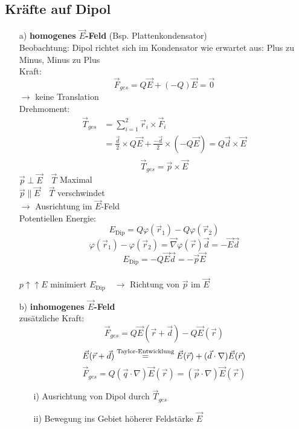 \documentclass[titlepage,12pt,a4paper,ngerman]{report}
\newcommand{\tx}[1]{\textrm{#1}}
\begin{document}

\subsection{Kräfte auf Dipol}
\begin{itemize}
\item[a)] \textbf{homogenes $\vec{E}$-Feld} (Bsp. Plattenkondensator)\\
Beobachtung: Dipol richtet sich im Kondensator wie erwartet aus: Plus zu Minus, Minus zu Plus\\
Kraft: $$\vec{F}_{ges} = Q \vec{E} + (-Q) \vec{E} = \vec{0}$$ $\rightarrow$ keine Translation\\
Drehmoment: \begin{align*}
\vec{T}_{ges} & = \sum^2_{i=1} \vec{r}_i\times \vec{F}_i \\
& = \frac{\vec{d}}{2} \times Q\vec{E} + \frac{-\vec{d}}{2} \times (-Q\vec{E}) = Q \vec{d} \times \vec{E}\\
\end{align*}
$$\boxed{\vec{T}_{ges} = \vec{p} \times \vec{E}}$$
$\vec{p} \perp \vec{E} \quad \vec{T}$ Maximal\\
$ \vec{p} \parallel \vec{E} \quad \vec{T}$ verschwindet\\
$\rightarrow$ Ausrichtung im $\vec{E}$-Feld\\
Potentiellen Energie:\\
$$ E_{\tx{Dip}}= Q \varphi(\vec{r}_1) - Q \varphi(\vec{r}_2)$$
$$\varphi(\vec{r}_1) - \varphi(\vec{r}_2) = \vec{\nabla} \varphi(\vec{r}) \vec{d} = -\vec{E} \vec{d}$$
$$E_{\tx{Dip}} = - Q \vec{E}\vec{d} = - \vec{p} \vec{E}$$\\
$p \uparrow \uparrow E$ minimiert $E_{\tx{Dip}} \quad \rightarrow$ Richtung von $\vec{p}$ im $\vec{E}$
\item[b)] \textbf{inhomogenes $\vec{E}$-Feld} \\
zusätzliche Kraft: $$\vec{F}_{ges} = Q \vec{E} (\vec{r}+\vec{d}) - Q \vec{E}(\vec{r})$$
$$\vec{E}(\vec{r}+\vec{d}) \buildrel \textrm{Taylor-Entwicklung} \over = \vec{E}(\vec{r}) + (\vec{d}\cdot \nabla ) \vec{E}(\vec{r})$$ 
$$\vec{F}_{ges} = Q ( \vec{q} \cdot \nabla ) \vec{E}(\vec{r}) = (\vec{p} \cdot \nabla ) \vec{E}(\vec{r})$$
\begin{itemize}
\item[i)] Ausrichtung von Dipol durch $\vec{T}_{ges}$
\item[ii)] Bewegung ins Gebiet höherer Feldstärke $\vec{E}$
\end{itemize}
\end{itemize}
\end{document}
